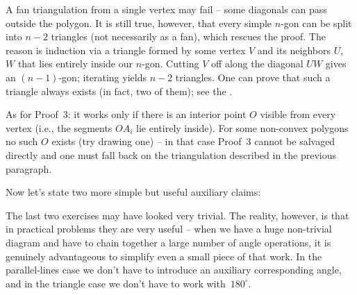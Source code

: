 {    A fan triangulation from a single vertex may fail -- some diagonals can pass outside the polygon. It is still true, however, that every simple $n$-gon can be split into $n-2$ triangles (not necessarily as a fan), which rescues the proof. The reason is induction via a triangle formed by some vertex $V$ and its neighbors $U$, $W$ that lies entirely inside our $n$-gon. Cutting $V$ off along the diagonal $UW$ gives an $(n-1)$-gon; iterating yields $n-2$ triangles. One can prove that such a triangle always exists (in fact, two of them); see the .

    As for Proof~3: it works only if there is an interior point $O$ visible from every vertex (i.e., the segments $OA_i$ lie entirely inside). For some non-convex polygons no such $O$ exists (try drawing one) -- in that case Proof~3 cannot be salvaged directly and one must fall back on the triangulation described in the previous paragraph.
}

Now let's state two more simple but useful auxiliary claims:



The last two exercises may have looked very trivial. The reality, however, is that in practical problems they are very useful -- when we have a huge non-trivial diagram and have to chain together a large number of angle operations, it is genuinely advantageous to simplify even a small piece of that work. In the parallel-lines case we don't have to introduce an auxiliary corresponding angle, and in the triangle case we don't have to work with~$180^\circ$.

